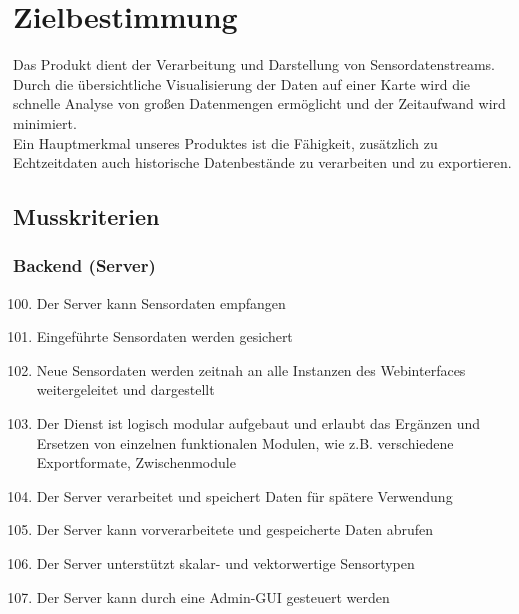 \chapter{Zielbestimmung}
Das Produkt dient der Verarbeitung und Darstellung von Sensordatenstreams. Durch die übersichtliche Visualisierung der Daten auf einer Karte wird die schnelle Analyse von großen Datenmengen ermöglicht und der Zeitaufwand wird minimiert.\\
Ein Hauptmerkmal unseres Produktes ist die Fähigkeit, zusätzlich zu Echtzeitdaten auch historische Datenbestände zu verarbeiten und zu exportieren.
\section{Musskriterien}
\subsection{Backend (Server)}
\begin{enumerate}[label=\textbf{MK\arabic{enumi}0}]
	\setcounter{enumi}{99}
	\item Der Server kann Sensordaten empfangen
	\item Eingeführte Sensordaten werden gesichert
	\item Neue Sensordaten werden zeitnah an alle Instanzen des Webinterfaces weitergeleitet und dargestellt
	\item Der Dienst ist logisch modular aufgebaut und erlaubt das Ergänzen und Ersetzen von einzelnen funktionalen Modulen, wie z.B. verschiedene Exportformate, Zwischenmodule
	\item Der Server verarbeitet und speichert Daten für spätere Verwendung
	\item Der Server kann vorverarbeitete und gespeicherte Daten abrufen
	\item Der Server unterstützt skalar- und vektorwertige Sensortypen
	\item Der Server kann durch eine Admin-GUI gesteuert werden
\end{enumerate}
